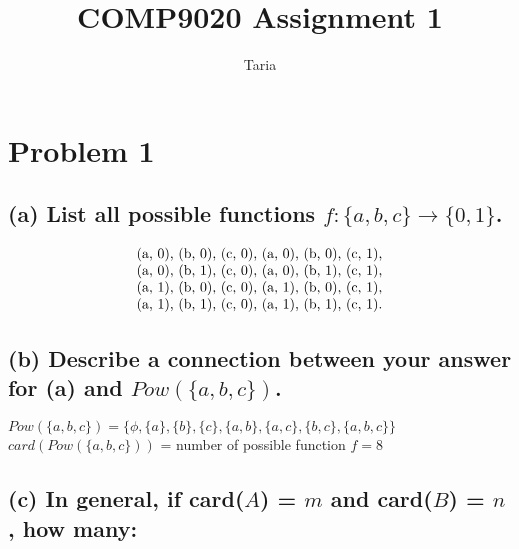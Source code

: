 \documentclass{article}
\begin{document}
\title{COMP9020 Assignment 1}
\author{Taria}
\maketitle

\section*{Problem 1}
\subsection*{(a) List all possible functions $f:\{a,b,c\}\to \{0,1\} $.}

\[
    \begin{array}{r}
    ${(a, 0), (b, 0), (c, 0)}, {(a, 0), (b, 0), (c, 1)},$\\
    ${(a, 0), (b, 1), (c, 0)}, {(a, 0), (b, 1), (c, 1)},$\\
    ${(a, 1), (b, 0), (c, 0)}, {(a, 1), (b, 0), (c, 1)},$\\
    ${(a, 1), (b, 1), (c, 0)}, {(a, 1), (b, 1), (c, 1)}$.
    \end{array}
\]

\subsection*{(b) Describe a connection between your answer for (a) and $Pow(\{a,b,c\})$.} 

$Pow(\{a,b,c\}) = \{\phi, \{a\}, \{b\}, \{c\}, \{a, b\}, \{a, c\}, \{b, c\}, \{a, b, c\}\} $\\
\indent$card(Pow(\{a, b, c\}))$ = number of possible function $f = 8$


\subsection*{(c) In general, if card($A$) = $m$ and card($B$) = $n$, how many:} 
\end{document}
